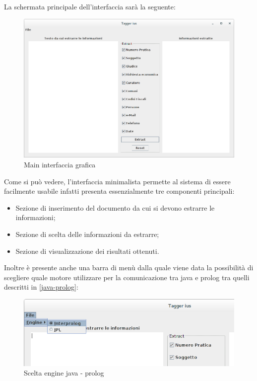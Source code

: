 La schermata principale dell'interfaccia sarà la seguente:
\begin{figure}[H]
	\includegraphics[width=1\textwidth]{img/interfaces/java-main.png}
	\caption{Main interfaccia grafica}
	\label{java-main}
\end{figure}

Come si può vedere, l'interfaccia minimalista permette al sistema di essere facilmente usabile infatti presenta essenzialmente tre componenti principali:
\begin{itemize}
  \item Sezione di inserimento del documento da cui si devono estrarre le informazioni;
  \item Sezione di scelta delle informazioni da estrarre;
  \item Sezione di visualizzazione dei risultati ottenuti.
\end{itemize}

Inoltre è presente anche una barra di menù dalla quale viene data la possibilità di scegliere quale motore utilizzare per la comunicazione tra java e prolog tra quelli descritti in \ref{java-prolog}:
\begin{figure}[H]
	\includegraphics[width=1\textwidth]{img/interfaces/java-engine.png}
	\caption{Scelta engine java - prolog}
	\label{java-engine}
\end{figure}
